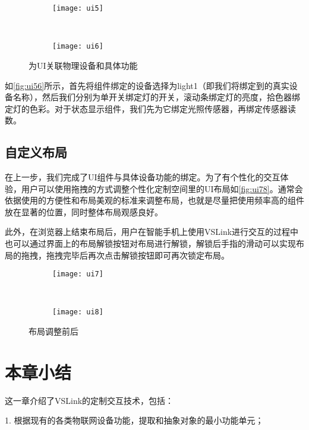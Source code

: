 \begin{figure}[htbp]
	\centering
	\begin{subfigure}{.48\linewidth}
		\texttt{[image: ui5]}
		\caption{}
	\end{subfigure}
	\ 
	\begin{subfigure}{.44\linewidth}
		\texttt{[image: ui6]}
		\caption{}
	\end{subfigure}
	\caption{为UI关联物理设备和具体功能}\label{fig:ui56}
\end{figure}

如\autoref{fig:ui56}所示，首先将组件绑定的设备选择为light1（即我们将绑定到的真实设备名称），然后我们分别为单开关绑定灯的开关，滚动条绑定灯的亮度，拾色器绑定灯的色彩。对于状态显示组件，我们先为它绑定光照传感器，再绑定传感器读数。
\subsection{自定义布局}
在上一步，我们完成了UI组件与具体设备功能的绑定。为了有个性化的交互体验，用户可以使用拖拽的方式调整个性化定制空间里的UI布局如\autoref{fig:ui78}。通常会依据使用的方便性和布局美观的标准来调整布局，也就是尽量把使用频率高的组件放在显著的位置，同时整体布局观感良好。

此外，在浏览器上结束布局后，用户在智能手机上使用VSLink进行交互的过程中也可以通过界面上的布局解锁按钮对布局进行解锁，解锁后手指的滑动可以实现布局的拖拽，拖拽完毕后再次点击解锁按钮即可再次锁定布局。

\begin{figure}[htbp]
	\centering
	\begin{subfigure}{.65\linewidth}
		\texttt{[image: ui7]}
		\caption{}
	\end{subfigure}
	\ 
	\begin{subfigure}{.65\linewidth}
		\texttt{[image: ui8]}
		\caption{}
	\end{subfigure}
	\caption{布局调整前后}\label{fig:ui78}
\end{figure}

\section{本章小结}
这一章介绍了VSLink的定制交互技术，包括：

1. 根据现有的各类物联网设备功能，提取和抽象对象的最小功能单元；

